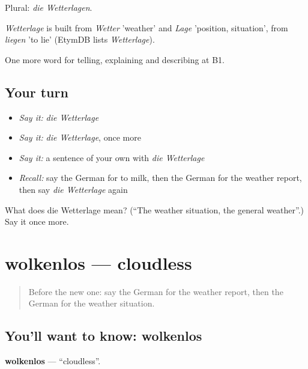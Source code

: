 Plural: \emph{die Wetterlagen}.

\begin{cousinweb}
\emph{Wetterlage} is built from \emph{Wetter} 'weather' and \emph{Lage} 'position, situation', from \emph{liegen} 'to lie' (EtymDB lists \emph{Wetterlage}).
\end{cousinweb}

\begin{grammarlens}[title={What you've built}]
One more word for telling, explaining and describing at B1.
\end{grammarlens}

\subsection*{Your turn}
\begin{itemize}
\raggedright
  \item \emph{Say it:} \emph{die Wetterlage}
  \item \emph{Say it:} \emph{die Wetterlage}, once more
  \item \emph{Say it:} a sentence of your own with \emph{die Wetterlage}
  \item \emph{Recall:} say the German for to milk, then the German for the weather report, then say \emph{die Wetterlage} again
\end{itemize}

\begin{tcolorbox}[breakable,colback=teal!4,colframe=teal!35!black,title={Before you move on}]
What does die Wetterlage mean? (\textquotedblleft{}The weather situation, the general weather\textquotedblright{}.) Say it once more.
\end{tcolorbox}
\section[wolkenlos]{wolkenlos — cloudless}

\label{lesson:GE-C460-wolkenlos}



\begin{quote}
Before the new one: say the German for the weather report, then the German for the weather situation.
\end{quote}

\subsection*{You'll want to know: wolkenlos}
\textbf{wolkenlos} — \textquotedblleft{}cloudless\textquotedblright{}.

